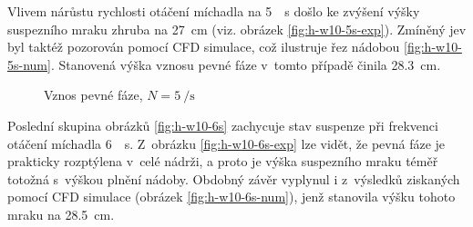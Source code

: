Vlivem nárůstu rychlosti otáčení míchadla na \SI{5}{\per\second} došlo ke zvýšení výšky suspezního mraku zhruba na \SI{27}{\centi\meter} (viz. obrázek \ref{fig:h-w10-5s-exp}). Zmíněný jev byl taktéž pozorován pomocí CFD simulace, což ilustruje řez nádobou \ref{fig:h-w10-5s-num}. Stanovená výška vznosu pevné fáze v~tomto případě činila \SI{28.3}{\centi\meter}. 
\newpage

\begin{figure}[t!]
 \centering
  \qquad 
  \caption{Vznos pevné fáze, $N=\SI{5}{\per\second}$}
  \label{fig:h-w10-5s}
\end{figure}
Poslední skupina obrázků \ref{fig:h-w10-6s} zachycuje stav suspenze při frekvenci otáčení míchadla \SI{6}{\per\second}. Z~obrázku \ref{fig:h-w10-6s-exp} lze vidět, že pevná fáze je prakticky rozptýlena v~celé nádrži, a proto je výška suspezního mraku téměř totožná s~výškou plnění nádoby. Obdobný závěr vyplynul i z~výsledků ziskaných pomocí CFD simulace (obrázek \ref{fig:h-w10-6s-num}), jenž stanovila výšku tohoto mraku na \SI{28.5}{\centi\meter}.

